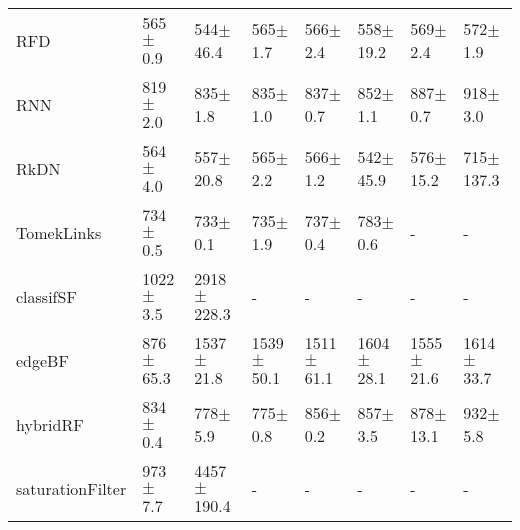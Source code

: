 \begin{tabular}{llllllll}
RFD              &    565$\pm$ 0.9 &    544$\pm$ 46.4 &    565$\pm$ 1.7 &    566$\pm$ 2.4 &    558$\pm$ 19.2 &     569$\pm$ 2.4 &     572$\pm$ 1.9 \\
RNN              &    819$\pm$ 2.0 &     835$\pm$ 1.8 &    835$\pm$ 1.0 &    837$\pm$ 0.7 &     852$\pm$ 1.1 &     887$\pm$ 0.7 &     918$\pm$ 3.0 \\
RkDN             &    564$\pm$ 4.0 &    557$\pm$ 20.8 &    565$\pm$ 2.2 &    566$\pm$ 1.2 &    542$\pm$ 45.9 &    576$\pm$ 15.2 &   715$\pm$ 137.3 \\
TomekLinks       &    734$\pm$ 0.5 &     733$\pm$ 0.1 &    735$\pm$ 1.9 &    737$\pm$ 0.4 &     783$\pm$ 0.6 &                - &                - \\
classifSF        &   1022$\pm$ 3.5 &  2918$\pm$ 228.3 &               - &               - &                - &                - &                - \\
edgeBF           &   876$\pm$ 65.3 &   1537$\pm$ 21.8 &  1539$\pm$ 50.1 &  1511$\pm$ 61.1 &   1604$\pm$ 28.1 &   1555$\pm$ 21.6 &   1614$\pm$ 33.7 \\
hybridRF         &    834$\pm$ 0.4 &     778$\pm$ 5.9 &    775$\pm$ 0.8 &    856$\pm$ 0.2 &     857$\pm$ 3.5 &    878$\pm$ 13.1 &     932$\pm$ 5.8 \\
saturationFilter &    973$\pm$ 7.7 &  4457$\pm$ 190.4 &               - &               - &                - &                - &                - \\
\bottomrule
\end{tabular}
